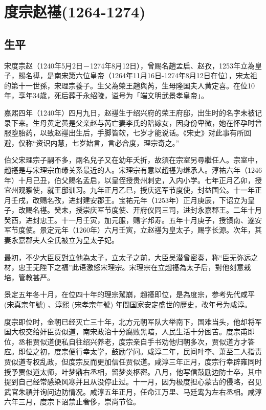 
\section{度宗赵禥\tiny(1264-1274)}

\subsection{生平}

宋度宗赵（1240年5月2日－1274年8月12日），曾赐名趙孟启、赵孜，1253年立為皇子，賜名禥，是南宋第六位皇帝（1264年11月16日-1274年8月12日在位），宋太祖的第十一世孫，宋理宗養子。生父為榮王趙與芮，生母隆国夫人黄定喜。在位10年，享年34歲，死后葬于永绍陵，谥号为「端文明武景孝皇帝」。

嘉熙四年（1240年）四月九日，赵禥生于绍兴府的荣王府邸，出生时的名字未被记录下来。生母黄定黄是父亲赵与芮亡妻李氏的陪嫁女，因身份卑微，她在怀孕时曾服堕胎药，以致赵禥出生后，手脚皆软，七岁才能说话。《宋史》对此事有所回避，仅称“资识内慧，七岁始言，言必合度，理宗奇之。”

伯父宋理宗子嗣不多，兩名兒子又在幼年夭折，故須在宗室另尋繼任人。宗室中，趙禥是与宋理宗血缘关系最近的人。宋理宗有意以趙禥为继承人。淳祐六年（1246年）十月己丑，伯父赐名孟启，以皇侄授贵州刺史，入内小学。七年正月乙卯，授宜州观察使，就王邸训习。九年正月乙巳，授庆远军节度使，封益国公。十一年正月壬戌，改赐名孜，进封建安郡王。宝祐元年（1253年）正月庚辰，下诏立为皇子，改赐名禥。癸未，授崇庆军节度使、开府仪同三司，进封永嘉郡王。二年十月癸酉，进封忠王。十一月壬寅，加元服，赐字邦寿。五年十月庚子，授镇南、遂安军节度使。景定元年（1260年）六月壬寅，立赵禥为皇太子，赐字长源。次年，其妻永嘉郡夫人全氏被立为皇太子妃。

最初，不少大臣反對立他為太子，立太子之前，大臣吴潜曾密奏，称“臣无弥远之材，忠王无陛下之福”此语激怒宋理宗。宋理宗在立趙禥為太子后，對他刻意栽培，管教甚严。

景定五年冬十月，在位四十年的理宗駕崩，趙禥即位，是為度宗，参考先代咸平 (宋真宗年號) 、淳熙 (宋孝宗年號) 年間国家安定盛世的歷史，改年号为咸淳。

度宗即位时，金朝已经灭亡三十年，北方元朝军队大举南下，国难当头，他却将军国大权交给奸臣贾似道，南宋政治十分腐败黑暗，人民生活十分困苦。度宗甫即位，丞相贾似道便私自往绍兴养老，度宗亲自手书劝他归朝多次，贾似道方才答应。即位之初，度宗便行幸太学，鼓励学问。咸淳二年，民间叶李、萧至二人指责贾似道专权乱政，但度宗反而更加信任贾似道。咸淳三年正月，度宗行幸辟雍同时授予贾似道太师，叶梦鼎右丞相，留梦炎枢密。八月，他写信鼓励边防士卒，其中提到自己经常感染风寒并且从没停止过。十一月，因为极度担心蒙古的侵略，召见武官朱禩并询问边防情况。咸淳五年正月，任命江万里、马廷鸾为左右丞相。咸淳六年三月，度宗下诏禁止奢侈，崇尚节俭。

